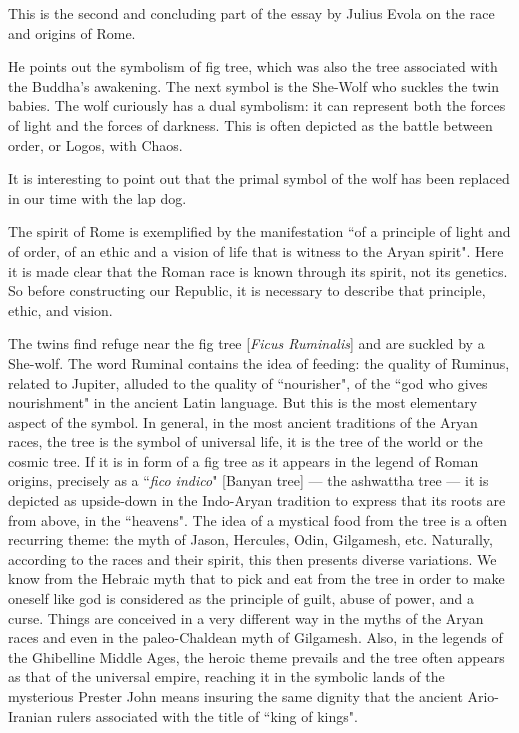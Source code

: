 \begin{quotex}
This is the second and concluding part of the essay by Julius Evola on the race and origins of Rome.

He points out the symbolism of fig tree, which was also the tree associated with the Buddha's awakening. The next symbol is the She-Wolf who suckles the twin babies. The wolf curiously has a dual symbolism: it can represent both the forces of light and the forces of darkness. This is often depicted as the battle between order, or Logos, with Chaos.

It is interesting to point out that the primal symbol of the wolf has been replaced in our time with the lap dog.

The spirit of Rome is exemplified by the manifestation ``of a principle of light and of order, of an ethic and a vision of life that is witness to the Aryan spirit". Here it is made clear that the Roman race is known through its spirit, not its genetics. So before constructing our Republic, it is necessary to describe that principle, ethic, and vision.

\end{quotex}
The twins find refuge near the fig tree [\emph{Ficus Ruminalis}] and are suckled by a She-wolf. The word Ruminal contains the idea of feeding: the quality of Ruminus, related to Jupiter, alluded to the quality of ``nourisher", of the ``god who gives nourishment" in the ancient Latin language. But this is the most elementary aspect of the symbol. In general, in the most ancient traditions of the Aryan races, the tree is the symbol of universal life, it is the tree of the world or the cosmic tree. If it is in form of a fig tree as it appears in the legend of Roman origins, precisely as a ``\emph{fico indico}" [Banyan tree] — the ashwattha tree — it is depicted as upside-down in the Indo-Aryan tradition to express that its roots are from above, in the ``heavens". The idea of a mystical food from the tree is a often recurring theme: the myth of Jason, Hercules, Odin, Gilgamesh, etc. Naturally, according to the races and their spirit, this then presents diverse variations. We know from the Hebraic myth that to pick and eat from the tree in order to make oneself like god is considered as the principle of guilt, abuse of power, and a curse. Things are conceived in a very different way in the myths of the Aryan races and even in the paleo-Chaldean myth of Gilgamesh. Also, in the legends of the Ghibelline Middle Ages, the heroic theme prevails and the tree often appears as that of the universal empire, reaching it in the symbolic lands of the mysterious Prester John means insuring the same dignity that the ancient Ario-Iranian rulers associated with the title of ``king of kings".

